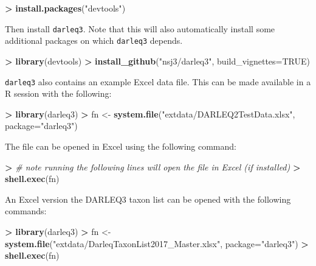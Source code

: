 \documentclass[]{article}
\newenvironment{Shaded}{\begin{snugshade}}{\end{snugshade}}
\newcommand{\KeywordTok}[1]{\textcolor[rgb]{0.13,0.29,0.53}{\textbf{#1}}}
\newcommand{\DataTypeTok}[1]{\textcolor[rgb]{0.13,0.29,0.53}{#1}}
\newcommand{\StringTok}[1]{\textcolor[rgb]{0.31,0.60,0.02}{#1}}
\newcommand{\CommentTok}[1]{\textcolor[rgb]{0.56,0.35,0.01}{\textit{#1}}}
\newcommand{\OtherTok}[1]{\textcolor[rgb]{0.56,0.35,0.01}{#1}}
\newcommand{\OperatorTok}[1]{\textcolor[rgb]{0.81,0.36,0.00}{\textbf{#1}}}
\newcommand{\ErrorTok}[1]{\textcolor[rgb]{0.64,0.00,0.00}{\textbf{#1}}}
\newcommand{\NormalTok}[1]{#1}
\begin{document}
\begin{Shaded}
\begin{Highlighting}[]
\OperatorTok{>}\StringTok{ }\KeywordTok{install.packages}\NormalTok{(}\StringTok{"devtools"}\NormalTok{)}
\end{Highlighting}
\end{Shaded}

Then install \texttt{darleq3}. Note that this will also automatically
install some additional packages on which \texttt{darleq3} depends.

\begin{Shaded}
\begin{Highlighting}[]
\OperatorTok{>}\StringTok{ }\KeywordTok{library}\NormalTok{(devtools)}
\OperatorTok{>}\StringTok{ }\KeywordTok{install_github}\NormalTok{(}\StringTok{"nsj3/darleq3"}\NormalTok{, }\DataTypeTok{build_vignettes=}\OtherTok{TRUE}\NormalTok{)}
\end{Highlighting}
\end{Shaded}

\texttt{darleq3} also contains an example Excel data file. This can be
made available in a R session with the following:

\begin{Shaded}
\begin{Highlighting}[]
\OperatorTok{>}\StringTok{ }\KeywordTok{library}\NormalTok{(darleq3)}
\OperatorTok{>}\StringTok{ }\NormalTok{fn <-}\StringTok{ }\KeywordTok{system.file}\NormalTok{(}\StringTok{"extdata/DARLEQ2TestData.xlsx"}\NormalTok{, }\DataTypeTok{package=}\StringTok{"darleq3"}\NormalTok{)}
\end{Highlighting}
\end{Shaded}

The file can be opened in Excel using the following command:

\begin{Shaded}
\begin{Highlighting}[]
\OperatorTok{>}\StringTok{ }\CommentTok{# note running the following lines will open the file in Excel (if installed)}
\ErrorTok{>}\StringTok{ }\KeywordTok{shell.exec}\NormalTok{(fn)}
\end{Highlighting}
\end{Shaded}

An Excel version the DARLEQ3 taxon list can be opened with the following
commands:

\begin{Shaded}
\begin{Highlighting}[]
\OperatorTok{>}\StringTok{ }\KeywordTok{library}\NormalTok{(darleq3)}
\OperatorTok{>}\StringTok{ }\NormalTok{fn <-}\StringTok{ }\KeywordTok{system.file}\NormalTok{(}\StringTok{"extdata/DarleqTaxonList2017_Master.xlsx"}\NormalTok{, }\DataTypeTok{package=}\StringTok{"darleq3"}\NormalTok{)}
\OperatorTok{>}\StringTok{ }\KeywordTok{shell.exec}\NormalTok{(fn)}
\end{Highlighting}
\end{Shaded}
\end{document}

